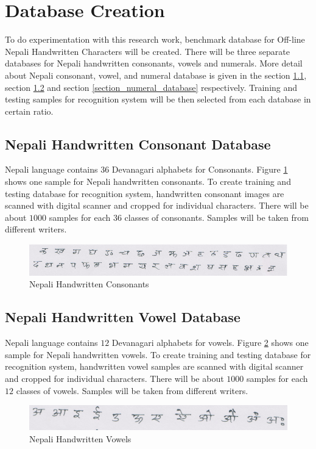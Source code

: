 \documentclass[12pt,a4paper,oneside]{article}
\numberwithin{equation}{section}
\numberwithin{algorithm}{section}
\begin{document}
\section{Database Creation} \label{database_creation}

To do experimentation with this research work, benchmark database for Off-line Nepali Handwritten Characters will be created. There will be three separate databases for Nepali handwritten consonants, vowels and numerals. More detail about Nepali consonant, vowel, and numeral database is given in the section \ref{section_consonant_database}, section \ref{section_vowel_database} and section \ref{section_numeral_database} respectively. Training and testing samples for recognition system will be then selected from each database in certain ratio.

\subsection{Nepali Handwritten Consonant Database}
\label{section_consonant_database}

Nepali language contains $36$ Devanagari alphabets for Consonants. Figure \ref{figure_ka_kha} shows one sample for Nepali handwritten consonants. To create training and testing database for recognition system, handwritten consonant images are scanned with digital scanner and cropped for individual characters. There will be about $1000$ samples for each $36$ classes of consonants. Samples will be taken from different writers.
\begin{figure}[hbtp]
\centering
\includegraphics[width=\linewidth]{figures/ka_kha}
\caption{Nepali Handwritten Consonants}
\label{figure_ka_kha}
\end{figure}

\subsection{Nepali Handwritten Vowel Database}
\label{section_vowel_database}
Nepali language contains $12$ Devanagari alphabets for vowels. Figure \ref{figure_a_aa} shows one sample for Nepali handwritten vowels. To create training and testing database for recognition system, handwritten vowel samples are scanned with digital scanner and cropped for individual characters. There will be about $1000$ samples for each $12$ classes of vowels. Samples will be taken from different writers.
\begin{figure}[hbtp]
\centering
\includegraphics[width=\linewidth]{figures/a_aa}
\caption{Nepali Handwritten Vowels}
\label{figure_a_aa}
\end{figure}
\end{document}
